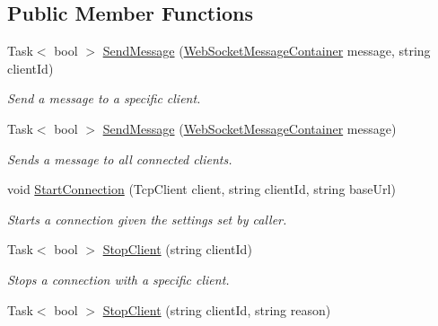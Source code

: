 \subsection*{Public Member Functions}
\begin{DoxyCompactItemize}
\item 
Task$<$ bool $>$ \mbox{\hyperlink{interface_simple_web_socket_server_library_1_1_simple_web_socket_handler_1_1_i_web_socket_handler_a3d9b246d14117c85014486b3f5bb71c8}{Send\+Message}} (\mbox{\hyperlink{class_simple_web_socket_server_library_1_1_web_socket_message_container}{Web\+Socket\+Message\+Container}} message, string client\+Id)
\begin{DoxyCompactList}\small\item\em Send a message to a specific client. \end{DoxyCompactList}\item 
Task$<$ bool $>$ \mbox{\hyperlink{interface_simple_web_socket_server_library_1_1_simple_web_socket_handler_1_1_i_web_socket_handler_a1b44785a16efa0750d5eb7e42aab28b8}{Send\+Message}} (\mbox{\hyperlink{class_simple_web_socket_server_library_1_1_web_socket_message_container}{Web\+Socket\+Message\+Container}} message)
\begin{DoxyCompactList}\small\item\em Sends a message to all connected clients. \end{DoxyCompactList}\item 
void \mbox{\hyperlink{interface_simple_web_socket_server_library_1_1_simple_web_socket_handler_1_1_i_web_socket_handler_af92326fd7434aab33b1dc154f9e3cb52}{Start\+Connection}} (Tcp\+Client client, string client\+Id, string base\+Url)
\begin{DoxyCompactList}\small\item\em Starts a connection given the settings set by caller. \end{DoxyCompactList}\item 
Task$<$ bool $>$ \mbox{\hyperlink{interface_simple_web_socket_server_library_1_1_simple_web_socket_handler_1_1_i_web_socket_handler_a38b3104f285279f6fd3101765b2f0076}{Stop\+Client}} (string client\+Id)
\begin{DoxyCompactList}\small\item\em Stops a connection with a specific client. \end{DoxyCompactList}\item 
Task$<$ bool $>$ \mbox{\hyperlink{interface_simple_web_socket_server_library_1_1_simple_web_socket_handler_1_1_i_web_socket_handler_ae8b12d5764a614d7827c51cdb086bee0}{Stop\+Client}} (string client\+Id, string reason)

\end{DoxyCompactItemize}
